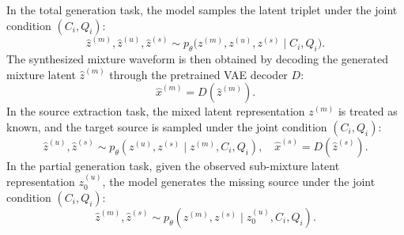 \documentclass[lettersize,journal]{IEEEtran}
\begin{document}
In the total generation task, the model samples the latent triplet under the joint condition $(C_i, Q_i)$:
  \begin{equation}\label{eq:mix_gen}
      \hat{z}^{(m)}, \hat{z}^{(u)}, \hat{z}^{(s)}
      \sim p_{\theta}\bigl(z^{(m)}, z^{(u)}, z^{(s)} \mid C_i, Q_i\bigr).
  \end{equation}
The synthesized mixture waveform is then obtained by decoding the generated mixture latent $\hat{z}^{(m)}$ through the
   pretrained VAE decoder $\mathit{D}$:
  \begin{equation}
      \hat{x}^{(m)} = D\!\left(\hat{z}^{(m)}\right).
  \end{equation}
In the source extraction task, the mixed latent representation $z^{(m)}$ is treated as known, and the target source is sampled under the joint condition $(C_i, Q_i)$:
  \begin{equation}\label{eq:source_extraction}
    \hat{z}^{(u)}, \hat{z}^{(s)} \sim
    p_{\theta}\!\left(z^{(u)}, z^{(s)} \mid z^{(m)}, C_i, Q_i\right),
    \quad
    \hat{x}^{(s)} = D\!\left(\hat{z}^{(s)}\right).
  \end{equation}
In the partial generation task, given the observed sub-mixture latent representation $z^{(u)}_0$, the model generates the missing source under the joint condition $(C_i, Q_i)$:
  \begin{equation}\label{eq:source_completion}
    \hat{z}^{(m)}, \hat{z}^{(s)}
    \sim
    p_{\theta}\!\left(z^{(m)}, z^{(s)} \mid z^{(u)}_{0}, C_i, Q_i\right).
  \end{equation}
\end{document}

